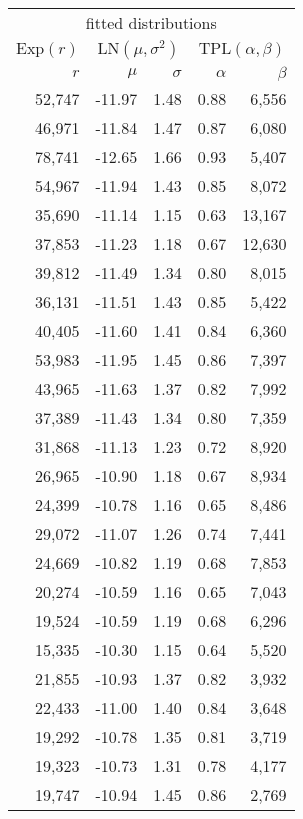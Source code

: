 \begin{tabular}{@{}rrrrr@{}}
\toprule
\multicolumn{5}{c}{fitted distributions}\\
\cmidrule(lr){1-5}
$\text{Exp}(r)$ & \multicolumn{2}{c}{$\text{LN}(\mu, \sigma^2)$} & \multicolumn{2}{c}{$\text{TPL}(\alpha, \beta)$}\\
\cmidrule(lr){1-5}
$r$ & $\mu$ & $\sigma$ & $\alpha$ & $\beta$\\
\cmidrule(lr){1-1} \cmidrule(lr){2-3} \cmidrule(lr){4-5}
52,747 & -11.97 & 1.48 & 0.88 & 6,556 \\
46,971 & -11.84 & 1.47 & 0.87 & 6,080 \\
78,741 & -12.65 & 1.66 & 0.93 & 5,407 \\
54,967 & -11.94 & 1.43 & 0.85 & 8,072 \\
35,690 & -11.14 & 1.15 & 0.63 & 13,167 \\
37,853 & -11.23 & 1.18 & 0.67 & 12,630 \\
39,812 & -11.49 & 1.34 & 0.80 & 8,015 \\
36,131 & -11.51 & 1.43 & 0.85 & 5,422 \\
40,405 & -11.60 & 1.41 & 0.84 & 6,360 \\
53,983 & -11.95 & 1.45 & 0.86 & 7,397 \\
43,965 & -11.63 & 1.37 & 0.82 & 7,992 \\
37,389 & -11.43 & 1.34 & 0.80 & 7,359 \\
31,868 & -11.13 & 1.23 & 0.72 & 8,920 \\
26,965 & -10.90 & 1.18 & 0.67 & 8,934 \\
24,399 & -10.78 & 1.16 & 0.65 & 8,486 \\
29,072 & -11.07 & 1.26 & 0.74 & 7,441 \\
24,669 & -10.82 & 1.19 & 0.68 & 7,853 \\
20,274 & -10.59 & 1.16 & 0.65 & 7,043 \\
19,524 & -10.59 & 1.19 & 0.68 & 6,296 \\
15,335 & -10.30 & 1.15 & 0.64 & 5,520 \\
21,855 & -10.93 & 1.37 & 0.82 & 3,932 \\
22,433 & -11.00 & 1.40 & 0.84 & 3,648 \\
19,292 & -10.78 & 1.35 & 0.81 & 3,719 \\
19,323 & -10.73 & 1.31 & 0.78 & 4,177 \\
19,747 & -10.94 & 1.45 & 0.86 & 2,769 \\
\bottomrule
\end{tabular}
